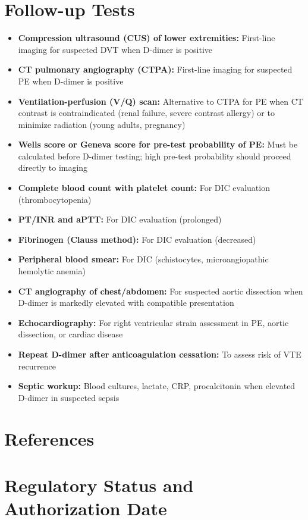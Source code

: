 \section*{Follow-up Tests}
\begin{itemize}
  \item \textbf{Compression ultrasound (CUS) of lower extremities:} First-line imaging for suspected DVT when D-dimer is positive
  \item \textbf{CT pulmonary angiography (CTPA):} First-line imaging for suspected PE when D-dimer is positive
  \item \textbf{Ventilation-perfusion (V/Q) scan:} Alternative to CTPA for PE when CT contrast is contraindicated (renal failure, severe contrast allergy) or to minimize radiation (young adults, pregnancy)
  \item \textbf{Wells score or Geneva score for pre-test probability of PE:} Must be calculated before D-dimer testing; high pre-test probability should proceed directly to imaging
  \item \textbf{Complete blood count with platelet count:} For DIC evaluation (thrombocytopenia)
  \item \textbf{PT/INR and aPTT:} For DIC evaluation (prolonged)
  \item \textbf{Fibrinogen (Clauss method):} For DIC evaluation (decreased)
  \item \textbf{Peripheral blood smear:} For DIC (schistocytes, microangiopathic hemolytic anemia)
  \item \textbf{CT angiography of chest/abdomen:} For suspected aortic dissection when D-dimer is markedly elevated with compatible presentation
  \item \textbf{Echocardiography:} For right ventricular strain assessment in PE, aortic dissection, or cardiac disease
  \item \textbf{Repeat D-dimer after anticoagulation cessation:} To assess risk of VTE recurrence
  \item \textbf{Septic workup:} Blood cultures, lactate, CRP, procalcitonin when elevated D-dimer in suspected sepsis
\end{itemize}

\section*{References}



\clearpage
\section*{Regulatory Status and Authorization Date}

\clearpage
